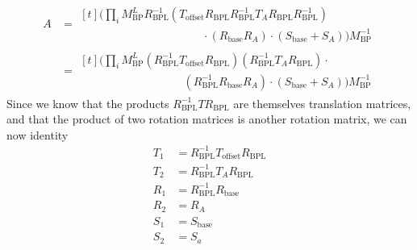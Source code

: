 \documentclass{article}
\begin{document}
\begin{align}
A  &= 
\begin{multlined}[t]
\Bigg( \prod_i M^L_\mathrm{BP} R_\mathrm{BPL}^{-1} \left(T_\mathrm{offset} R_\mathrm{BPL}R_\mathrm{BPL}^{-1}T_A R_\mathrm{BPL}R_\mathrm{BPL}^{-1}\right) \\
\hspace{130pt}  \cdot \left(R_\mathrm{base} R_A\right) \cdot \left(S_\mathrm{base} + S_A\right) \Bigg) M_\mathrm{BP}^{-1}
\end{multlined}\\
 &= \begin{multlined}[t]
\Bigg( \prod_i M^L_\mathrm{BP} \left( R_\mathrm{BPL}^{-1} T_\mathrm{offset} R_\mathrm{BPL}\right)\left( R_\mathrm{BPL}^{-1}T_A R_\mathrm{BPL}\right) \cdot \\
\hspace{110pt} \left(R_\mathrm{BPL}^{-1}  R_\mathrm{base} R_A\right) \cdot \left(S_\mathrm{base} + S_A\right) \Bigg) M_\mathrm{BP}^{-1}
\end{multlined}
\end{align}
Since we know that the products $R^{-1}_\mathrm{BPL} T R_\mathrm{BPL}$ are themselves translation matrices, and that the product of two rotation matrices is another rotation matrix, we can now identity
\begin{align}
T_1 &= R_\mathrm{BPL}^{-1} T_\mathrm{offset} R_\mathrm{BPL}\\
T_2 &= R_\mathrm{BPL}^{-1} T_A R_\mathrm{BPL}\\
R_1 &= R_\mathrm{BPL}^{-1} R_\mathrm{base}\\
R_2 &= R_A\\
S_1 &= S_\mathrm{base}\\
S_2 &= S_a
\end{align}
\end{document}

